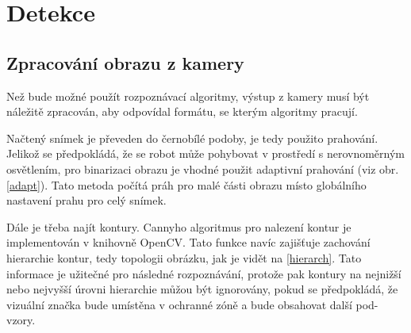 \documentclass[twoside]{ctuthesis}
\theoremstyle{plain}
\theoremstyle{definition}
\theoremstyle{note}
\begin{document}
\chapter{Detekce}

\section{Zpracování obrazu z kamery}

Než bude možné použít rozpoznávací algoritmy, výstup z kamery musí být náležitě zpracován, aby odpovídal formátu, se kterým algoritmy pracují.




Načtený snímek je převeden do černobílé podoby, je tedy použito prahování. Jelikož se předpokládá, že se robot může pohybovat v prostředí s nerovnoměrným osvětlením, pro binarizaci obrazu je vhodné použit adaptivní prahování \cite{cite:5} (viz obr. \ref{adapt}). Tato metoda počítá práh pro malé části obrazu místo globálního nastavení prahu pro celý snímek.

Dále je třeba najít kontury. Cannyho algoritmus pro nalezení kontur je implementován v knihovně OpenCV. Tato funkce navíc zajišťuje zachování hierarchie kontur\cite{cite:6}, tedy topologii obrázku, jak je vidět na \ref{hierarch}. Tato informace je užitečné pro následné rozpoznávání, protože pak kontury na nejnižší nebo nejvyšší úrovni hierarchie můžou být ignorovány, pokud se předpokládá, že vizuální značka bude umístěna v ochranné zóně a bude obsahovat další pod-vzory.
\end{document}
